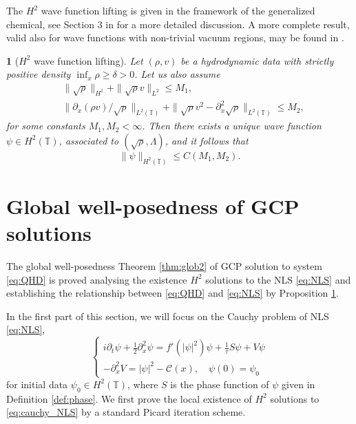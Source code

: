 \documentclass[leqno]{amsart}
\theoremstyle{plain}
\theoremstyle{definition}
\theoremstyle{remark}
\theoremstyle{plain}
\theoremstyle{plain}
\newtheorem{prop}[thm]{\protect\propositionname}
\providecommand{\propositionname}{Proposition}
\def\T{{\mathbb T}}%
\def\d{{\partial}}
\numberwithin{equation}{section}
\begin{document}
The $H^2$ wave function lifting is given in the framework of the generalized chemical, see Section 3 in \cite{AMZ1} for a more detailed discussion. A more complete result, valid also for wave functions with non-trivial vacuum regions, may be found in \cite[Proposition 24]{AMZ1}.

\begin{prop}[$H^2$ wave function lifting]\label{prop:lift2}
Let $(\rho,v)$ be a hydrodynamic data with strictly positive density $\inf_x\rho\geq \delta >0$. Let us also assume 
\begin{equation}\label{eq:bd_lift2}
\begin{aligned}
&\|\sqrt{\rho}\|_{H^1}+\|\sqrt\rho v\|_{L^2}\leq M_1,\\
&\|\d_x (\rho v)/\sqrt{\rho}\|_{L^2(\T)}+\|\sqrt{\rho} v^2-\d_x^2\sqrt{\rho}\|_{L^2(\T)}\leq M_2,
\end{aligned}
\end{equation}
for some constants $M_1,M_2<\infty$. Then there exists a unique wave function $\psi\in H^2(\T)$, associated to $(\sqrt\rho,\Lambda)$, and it follows that
\begin{equation}\label{eq:H2_lift}
\|\psi\|_{H^2(\T)}\leq C(M_1,M_2).
\end{equation}
\end{prop}

\section{Global well-posedness of GCP solutions}\label{sect:exist}

The global well-posedness Theorem \ref{thm:glob2} of GCP solution to system \eqref{eq:QHD} is proved analysing the existence $H^2$ solutions to the NLS \eqref{eq:NLS} and establishing the relationship between \eqref{eq:QHD} and \eqref{eq:NLS} by Proposition \ref{prop:lift2}.

In the first part of this section, we will focus on the Cauchy problem of NLS \eqref{eq:NLS},
\begin{equation}\label{eq:cauchy_NLS}
\begin{cases}
i\d_t\psi+\frac12\d_x^2\psi=f'(|\psi|^2)\psi+\frac{1}{\tau}S\psi+V\psi\\
-\d_x^2 V=|\psi|^2-\mathcal{C}(x),\quad \psi(0)=\psi_0
\end{cases}
\end{equation}
for initial data $\psi_0\in H^2(\T)$, where $S$ is the phase function of $\psi$ given in Definition \ref{def:phase}. We first prove the local existence of $H^2$ solutions to \eqref{eq:cauchy_NLS} by a standard Picard iteration scheme.
\end{document}
